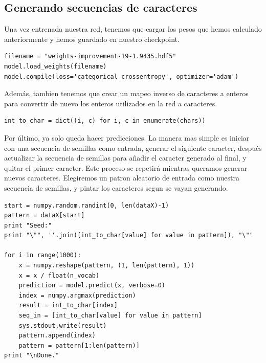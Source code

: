 \subsection{Generando secuencias de caracteres}
Una vez entrenada nuestra red, tenemos que cargar los pesos que hemos calculado anteriormente y hemos guardado en nuestro checkpoint.
\begin{verbatim}
filename = "weights-improvement-19-1.9435.hdf5"
model.load_weights(filename)
model.compile(loss='categorical_crossentropy', optimizer='adam')
\end{verbatim}
Además, tambien tenemos que crear un mapeo inverso de caracteres a enteros para convertir de nuevo los enteros utilizados en la red a caracteres.
\begin{verbatim}
int_to_char = dict((i, c) for i, c in enumerate(chars))
\end{verbatim}
Por último, ya solo queda hacer predicciones. La manera mas simple es iniciar con una secuencia de semillas como entrada, generar el siguiente caracter, después actualizar la secuencia de semillas para añadir el caracter generado al final, y quitar el primer caracter.  Este proceso se repetirá mientras queramos generar nuevos caracteres. Elegiremos un patron aleatorio de entrada como nuestra secuencia de semillas, y pintar los caracteres segun se vayan generando.
\begin{verbatim}
start = numpy.random.randint(0, len(dataX)-1)
pattern = dataX[start]
print "Seed:"
print "\"", ''.join([int_to_char[value] for value in pattern]), "\""

for i in range(1000):
	x = numpy.reshape(pattern, (1, len(pattern), 1))
	x = x / float(n_vocab)
	prediction = model.predict(x, verbose=0)
	index = numpy.argmax(prediction)
	result = int_to_char[index]
	seq_in = [int_to_char[value] for value in pattern]
	sys.stdout.write(result)
	pattern.append(index)
	pattern = pattern[1:len(pattern)]
print "\nDone."
\end{verbatim}
